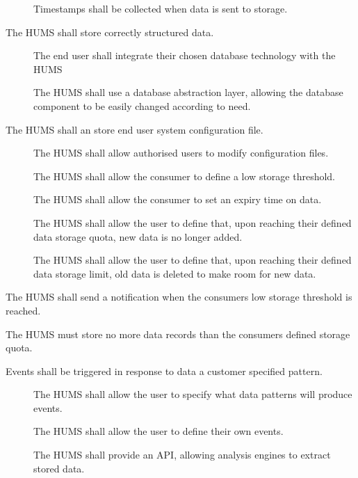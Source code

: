 \begin{description}
\begin{description}
 		 \item[] Timestamps shall be collected when data is sent 	
		to storage.
	\end{description}
	 \item[\fr{3}] The HUMS shall store correctly structured data.
	 \begin{description}
	 	\item[] The end user shall integrate their chosen database 
			technology with the HUMS
	 	\item[] The HUMS shall use a database abstraction layer, 
			allowing the database component to be easily changed 
according to 			need.
	  \end{description}
	 \item[\fr{4}] The HUMS shall an store end user system configuration 
			file.
	 \begin{description}
	  	\item[] The HUMS shall allow authorised users to modify
 		configuration files. 
		 \item[] The HUMS shall allow the consumer to define a 	
			low storage threshold.
		  \item[] The HUMS shall allow the consumer to set an 
			expiry time on data.
		  \item[]  The HUMS shall allow the user to define that, 
			upon reaching their defined data storage quota, new data is 
			no longer added.
		 \item[] The HUMS shall allow the user to define that, 
			upon reaching their defined data storage limit, old data is 
			deleted to make room for new data.
	\end{description}
	 \item[\fr{5}] The HUMS shall send a notification when the consumers 
		low storage threshold is reached.
	  \item[\fr{6}] The HUMS must store no more data records than the 	
		consumers defined storage quota.
	\item[\fr{7}]Events shall be triggered in response to data a customer 	
		specified pattern.
		  \begin{description}
			 \item[]  The HUMS shall allow the user to specify 	
			what data patterns will produce events.
			 \item[] The HUMS shall allow the user to define their
 			own events.
		
 			\item[] The HUMS shall provide an API, 			
			allowing analysis engines to extract stored data.
		

\end{description}
\end{description}
